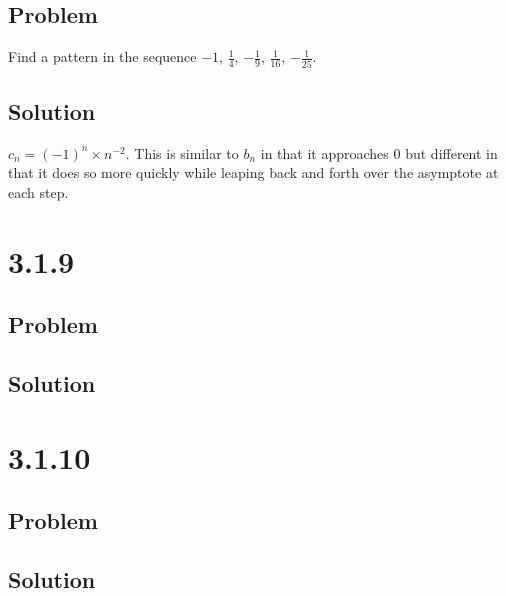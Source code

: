 \documentclass[12pt]{article}
\begin{document}
\subsection*{Problem}

Find a pattern in the sequence $-1$, $\frac{1}{4}$, $-\frac{1}{9}$, $\frac{1}{16}$, $-\frac{1}{25}$.

\subsection*{Solution}

$c_n = (-1)^n \times n^{-2}$. This is similar to $b_n$ in that it approaches 0 but different in that it does so more quickly while leaping back and forth over the asymptote at each step.



\section*{3.1.9}

\subsection*{Problem}

\subsection*{Solution}



\section*{3.1.10}

\subsection*{Problem}

\subsection*{Solution}
\end{document}
